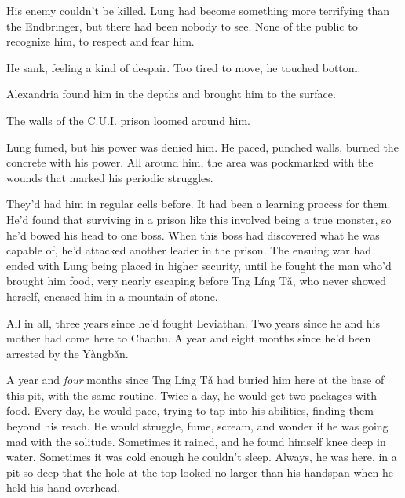 His enemy couldn't be killed.  Lung had become something more terrifying than the Endbringer, but there had been nobody to see.  None of the public to recognize him, to respect and fear him.



He sank, feeling a kind of despair.  Too tired to move, he touched bottom.



Alexandria found him in the depths and brought him to the surface.



\blacksquare






The walls of the C.U.I. prison loomed around him.



Lung fumed, but his power was denied him.  He paced, punched walls, burned the concrete with his power.  All around him, the area was pockmarked with the wounds that marked his periodic struggles.



They'd had him in regular cells before.  It had been a learning process for them.  He'd found that surviving in a prison like this involved being a true monster, so he'd bowed his head to one boss.  When this boss had discovered what he was capable of, he'd attacked another leader in the prison.  The ensuing war had ended with Lung being placed in higher security, until he fought the man who'd brought him food, very nearly escaping before Tng L\'{i}ng T\v{a}, who never showed herself, encased him in a mountain of stone.



All in all, three years since he'd fought Leviathan.  Two years since he and his mother had come here to Chaohu.  A year and eight months since he'd been arrested by the Y\`{a}ngb\v{a}n.



A year and \emph{four }months since Tng L\'{i}ng T\v{a} had buried him here at the base of this pit, with the same routine.  Twice a day, he would get two packages with food.  Every day, he would pace, trying to tap into his abilities, finding them beyond his reach.  He would struggle, fume, scream, and wonder if he was going mad with the solitude.  Sometimes it rained, and he found himself knee deep in water.  Sometimes it was cold enough he couldn't sleep.  Always, he was here, in a pit so deep that the hole at the top looked no larger than his handspan when he held his hand overhead.



